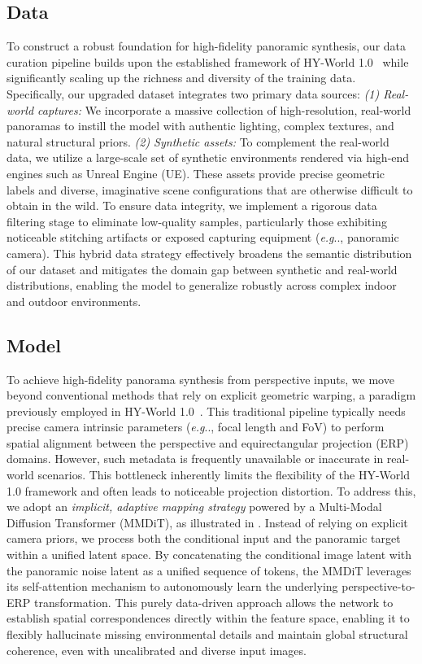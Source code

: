 \documentclass{article} %
\makeatletter
\DeclareRobustCommand\onedot{\futurelet\@let@token\@onedot}
\def\@onedot{\ifx\@let@token.\else.\null\fi\xspace}
\def\eg{\emph{e.g}\onedot} \def\Eg{\emph{E.g}\onedot}
\makeatother
\begin{document}
\subsection{Data}

To construct a robust foundation for high-fidelity panoramic synthesis, our data curation pipeline builds upon the established framework of HY-World 1.0~\cite{hunyuanworld2025tencent} while significantly scaling up the richness and diversity of the training data. 
Specifically, our upgraded dataset integrates two primary data sources: 
\textit{(1) Real-world captures:} We incorporate a massive collection of high-resolution, real-world panoramas to instill the model with authentic lighting, complex textures, and natural structural priors. 
\textit{(2) Synthetic assets:} To complement the real-world data, we utilize a large-scale set of synthetic environments rendered via high-end engines such as Unreal Engine (UE). These assets provide precise geometric labels and diverse, imaginative scene configurations that are otherwise difficult to obtain in the wild. 
To ensure data integrity, we implement a rigorous data filtering stage to eliminate low-quality samples, particularly those exhibiting noticeable stitching artifacts or exposed capturing equipment (\eg, panoramic camera).
This hybrid data strategy effectively broadens the semantic distribution of our dataset and mitigates the domain gap between synthetic and real-world distributions, enabling the model to generalize robustly across complex indoor and outdoor environments.


\subsection{Model}


To achieve high-fidelity panorama synthesis from perspective inputs, we move beyond conventional methods that rely on explicit geometric warping, a paradigm previously employed in HY-World 1.0~\cite{hunyuanworld2025tencent}. This traditional pipeline typically needs precise camera intrinsic parameters (\eg, focal length and FoV) to perform spatial alignment between the perspective and equirectangular projection (ERP) domains.
However, such metadata is frequently unavailable or inaccurate in real-world scenarios.
This bottleneck inherently limits the flexibility of the HY-World 1.0 framework and often leads to noticeable projection distortion.
To address this, we adopt an \textit{implicit, adaptive mapping strategy} powered by a Multi-Modal Diffusion Transformer (MMDiT), as illustrated in .
Instead of relying on explicit camera priors, we process both the conditional input and the panoramic target within a unified latent space. By concatenating the conditional image latent with the panoramic noise latent as a unified sequence of tokens, the MMDiT leverages its self-attention mechanism to autonomously learn the underlying perspective-to-ERP transformation.
This purely data-driven approach allows the network to establish spatial correspondences directly within the feature space, enabling it to flexibly hallucinate missing environmental details and maintain global structural coherence, even with uncalibrated and diverse input images.
\end{document}
